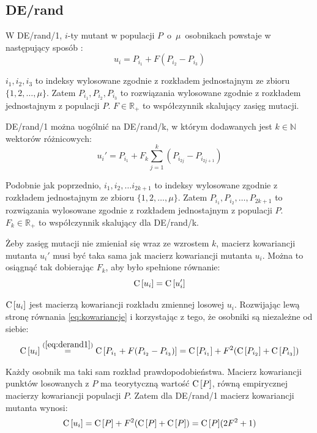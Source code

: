 \documentclass[a4paper,onecolumn,oneside,12pt,wide,floatssmall]{mwrep}
\def\C{{\rm C}\,}
\theoremstyle{definition}
\theoremstyle{plain}%
\theoremstyle{remark}
\begin{document}
\subsection{DE/rand}
\label{chap:de_rand} 

W DE/rand/1, $i$-ty mutant w populacji $P$~o~$\mu$~osobnikach powstaje w następujący sposób 
\cite{decomposition}:
\begin{equation} \label{eq:derand1}
u_i = P_{i_1} + F(P_{i_2} - P_{i_3})
\end{equation}

$i_1, i_2, i_3$ to indeksy wylosowane zgodnie z rozkładem jednostajnym ze zbioru \\ 
$\{1, 2, \dots, \mu\}$. Zatem $P_{i_1}, P_{i_2}, P_{i_3}$ to rozwiązania wylosowane zgodnie z 
rozkładem jednostajnym z populacji $P$.
$F\in\mathbb{R_+}$ to współczynnik skalujący zasięg mutacji. 

DE/rand/1 można uogólnić na DE/rand/k, w którym dodawanych jest
$k \in \mathbb{N}$ wektorów różnicowych:
\begin{equation} \label{eq:derand}
u_i' = P_{i_1} + F_k\sum\limits_{j=1}^k (P_{i_{2j}} - P_{i_{2j+1}})
\end{equation}

Podobnie jak poprzednio, $i_1, i_2, \dots i_{2k+1}$ to indeksy wylosowane zgodnie z rozkładem jednostajnym ze zbioru 
$\{1, 2, \dots, \mu\}$. Zatem $P_{i_1}, P_{i_2}, \dots, P_{2k+1}$ to rozwiązania wylosowane zgodnie z rozkładem 
jednostajnym z populacji $P$. $F_k\in\mathbb{R_+}$ to współczynnik skalujący dla DE/rand/k. 

Żeby zasięg mutacji nie zmieniał się wraz ze wzrostem $k$, 
macierz kowariancji mutanta $u_i'$ musi być taka sama jak macierz kowariancji mutanta $u_i$.
Można to osiągnąć tak dobierając $F_k$, aby było spełnione równanie:
\begin{equation} \label{eq:kowariancje}
\C[u_i] = \C[u_i']
\end{equation}

$\C[u_i]$ jest macierzą kowariancji rozkładu zmiennej losowej $u_i$.
Rozwijając lewą stronę równania \eqref{eq:kowariancje} i korzystając z tego, że osobniki są niezależne od siebie:
\begin{align*}
\C[u_i] \overset{(\ref{eq:derand1})}{=} \C[P_{i_1} + F(P_{i_2} - P_{i_3})] = \C[P_{i_1}] + F^2(\C[P_{i_2}] + \C[P_{i_3}])
\end{align*}

Każdy osobnik ma taki sam rozkład prawdopodobieństwa. 
Macierz kowariancji punktów losowanych z $P$ ma teorytyczną wartość $\C[P]$,
równą empirycznej macierzy kowariancji populacji $P$.
Zatem dla DE/rand/1 macierz kowariancji mutanta wynosi:
\begin{equation} \label{eq:macierz_kow_mutanta}
\C[u_i] = \C[P] + F^2(\C[P] + \C[P]) = \C[P](2F^2 + 1)
\end{equation}
\end{document}
